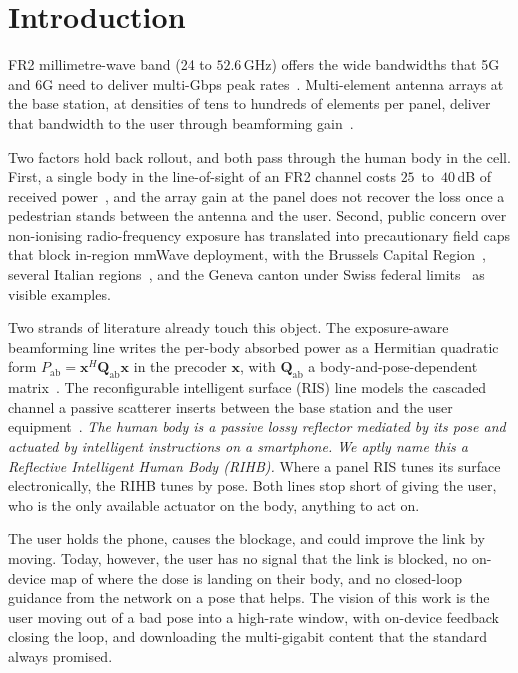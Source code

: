 \documentclass[journal,twocolumn,10pt]{IEEEtran}
\theoremstyle{plain}
\theoremstyle{definition}
\theoremstyle{remark}
\newcommand{\xx}{\mathbf{x}}
\newcommand{\Pabs}{P_{\mathrm{ab}}}
\newcommand{\Qabs}{\mathbf{Q}_{\mathrm{ab}}}
\begin{document}
\IEEEpeerreviewmaketitle


\section{Introduction}\label{sec:intro}

 FR2 millimetre-wave band (24 to
$52.6\,$GHz) offers the wide bandwidths that 5G and 6G need to
deliver multi-Gbps peak rates~\cite{general5G,TS38214}. Multi-element
antenna arrays at the base station, at densities of tens to hundreds
of elements per panel, deliver that bandwidth to the user through
beamforming gain~\cite{HeathLozanoFA2018}.

Two factors hold back rollout, and both pass through the human body
in the cell. First, a single body in the line-of-sight of an FR2
channel costs $25$~to~$40\,$dB of received
power~\cite{Maccartney2017blockage,MacCartney2017}, and the array
gain at the panel does not recover the loss once a pedestrian
stands between the antenna and the user. Second, public concern over
non-ionising radio-frequency exposure has translated into
precautionary field caps that block in-region mmWave deployment, with
the Brussels Capital Region~\cite{BrusselsArrete2007,BrusselsArrete2024},
several Italian regions~\cite{ItalyDL}, and the Geneva canton under
Swiss federal limits~\cite{SwissNISV2000} as visible examples.

Two strands of literature already touch this object. The
exposure-aware beamforming line writes the per-body absorbed power as
a Hermitian quadratic form $\Pabs = \xx^{H}\Qabs\xx$ in the precoder
$\xx$, with $\Qabs$ a body-and-pose-dependent
matrix~\cite{Hochwald2014,Ying2015,Ying2017}. The reconfigurable
intelligent surface (RIS) line models the cascaded channel a passive
scatterer inserts between the base station and the user
equipment~\cite{DiRenzo2020,Wu2019}.
\emph{The human body is a passive lossy reflector mediated by its
pose and actuated by intelligent instructions on a smartphone. We
aptly name this a Reflective Intelligent Human Body (RIHB).} Where a
panel RIS tunes its surface electronically, the RIHB tunes by pose.
Both lines stop short of giving the user, who is the only available
actuator on the body, anything to act on.

The user holds the phone, causes the blockage, and could improve the
link by moving. Today, however, the user has no signal that the link
is blocked, no on-device map of where the dose is landing on their
body, and no closed-loop guidance from the network on a pose that
helps. The vision of this work is the user moving out of a bad pose
into a high-rate window, with on-device feedback closing the loop,
and downloading the multi-gigabit content that the standard always
promised.
\end{document}
